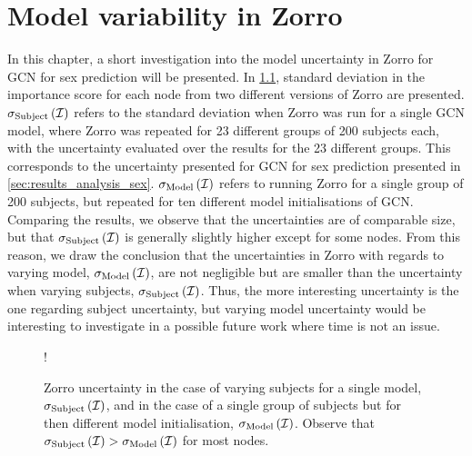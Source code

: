 \chapter{Model variability in Zorro}
\label{app:zorro_model_uncertainty}

In this chapter, a short investigation into the model uncertainty in Zorro for GCN for sex prediction will be presented. In \cref{fig:zorro_model_uncertainty}, standard deviation in the importance score for each node from two different versions of Zorro are presented. $\sigma_{\rm{Subject}}\left(\mathcal{I}\right)$ refers to the standard deviation when Zorro was run for a single GCN model, where Zorro was repeated for 23 different groups of 200 subjects each, with the uncertainty evaluated over the results for the 23 different groups. This corresponds to the uncertainty presented for GCN for sex prediction presented in \cref{sec:results_analysis_sex}. $\sigma_{\rm{Model}}\left(\mathcal{I}\right)$ refers to running Zorro for a single group of 200 subjects, but repeated for ten different model initialisations of GCN. Comparing the results, we observe that the uncertainties are of comparable size, but that $\sigma_{\rm{Subject}}\left(\mathcal{I}\right)$ is generally slightly higher except for some nodes. From this reason, we draw the conclusion that the uncertainties in Zorro with regards to varying model, $\sigma_{\rm{Model}}\left(\mathcal{I}\right)$, are not negligible but are smaller than the uncertainty when varying subjects, $\sigma_{\rm{Subject}}\left(\mathcal{I}\right)$. Thus, the more interesting uncertainty is the one regarding subject uncertainty, but varying model uncertainty would be interesting to investigate in a possible future work where time is not an issue.

\begin{figure}[ht]
    \centering
    \begin{center}
        \resizebox {0.6\linewidth} {!} {
            
        }
    \end{center}
    \caption{Zorro uncertainty in the case of varying subjects for a single model, $\sigma_{\rm{Subject}}\left(\mathcal{I}\right)$, and in the case of a single group of subjects but for then different model initialisation, $\sigma_{\rm{Model}}\left(\mathcal{I}\right)$. Observe that $\sigma_{\rm{Subject}}\left(\mathcal{I}\right) > \sigma_{\rm{Model}}\left(\mathcal{I}\right)$ for most nodes.}
    \label{fig:zorro_model_uncertainty}
\end{figure}